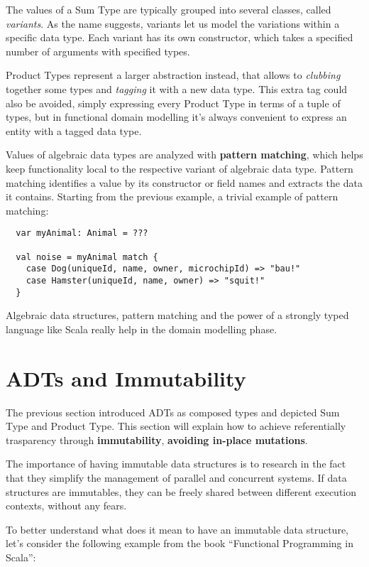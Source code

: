 The values of a Sum Type are typically grouped into several classes,
called \emph{variants}. As the name suggests, variants let us model the
variations within a specific data type. Each variant has its own
constructor, which takes a specified number of arguments with specified
types.

Product Types represent a larger abstraction instead, that allows to
\emph{clubbing} together some types and \emph{tagging} it with a new
data type. This extra tag could also be avoided, simply expressing every
Product Type in terms of a tuple of types, but in functional domain
modelling it's always convenient to express an entity with a tagged data
type.

Values of algebraic data types are analyzed with \textbf{pattern
matching}, which helps keep functionality local to the respective
variant of algebraic data type. Pattern matching identifies a value by
its constructor or field names and extracts the data it contains.
Starting from the previous example, a trivial example of pattern
matching:

\begin{verbatim}
  var myAnimal: Animal = ???

  val noise = myAnimal match {
    case Dog(uniqueId, name, owner, microchipId) => "bau!"
    case Hamster(uniqueId, name, owner) => "squit!"
  }
\end{verbatim}

Algebraic data structures, pattern matching and the power of a strongly
typed language like Scala really help in the domain modelling phase.

\section{ADTs and Immutability}\label{adts-and-immutability}

The previous section introduced ADTs as composed types and depicted Sum
Type and Product Type. This section will explain how to achieve
referentially trasparency through \textbf{immutability},
\textbf{avoiding in-place mutations}.

The importance of having immutable data structures is to research in the
fact that they simplify the management of parallel and concurrent
systems. If data structures are immutables, they can be freely shared
between different execution contexts, without any fears.

To better understand what does it mean to have an immutable data
structure, let's consider the following example from the book
``Functional Programming in Scala'':

